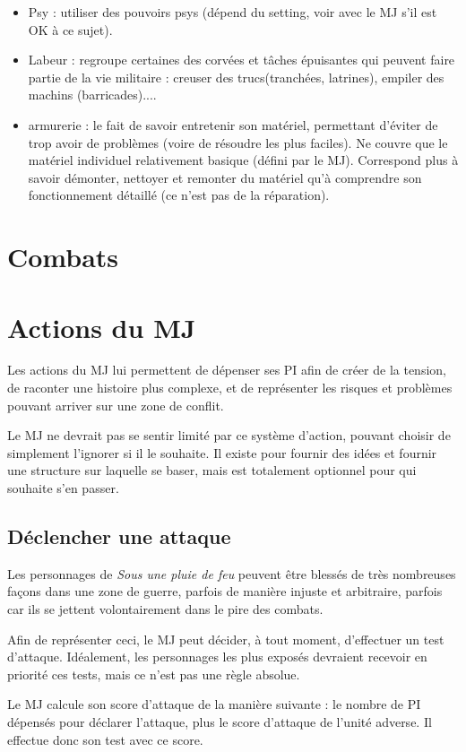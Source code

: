 \documentclass[twocolumn]{report}
\newcommand{\nomjeu}{\textit{Sous une pluie de feu }}
\begin{document}
\begin{itemize}
    \item Psy : utiliser des pouvoirs psys (dépend du setting, voir avec le MJ s'il est OK à ce sujet).
    \item Labeur : regroupe certaines des corvées et tâches épuisantes qui peuvent faire partie de la vie militaire : creuser des trucs(tranchées, latrines), empiler des machins (barricades)....
    \item armurerie : le fait de savoir entretenir son matériel, permettant d'éviter de trop avoir de problèmes (voire de résoudre les plus faciles). Ne couvre que le matériel individuel relativement basique (défini par le MJ). Correspond plus à savoir démonter, nettoyer et remonter du matériel qu'à comprendre son fonctionnement détaillé (ce n'est pas de la réparation).
\end{itemize}
\section{Combats}

\section{Actions du MJ}
Les actions du MJ lui permettent de dépenser ses PI afin de créer de la tension, de raconter une histoire plus complexe, et de représenter les risques et problèmes pouvant arriver sur une zone de conflit.

Le MJ ne devrait pas se sentir limité par ce système d'action, pouvant choisir de simplement l'ignorer si il le souhaite. Il existe pour fournir des idées et fournir une structure sur laquelle se baser, mais est totalement optionnel pour qui souhaite s'en passer.
\subsection{Déclencher une attaque}
Les personnages de \nomjeu peuvent être blessés de très nombreuses façons dans une zone de guerre, parfois de manière injuste et arbitraire, parfois car ils se jettent volontairement dans le pire des combats.

Afin de représenter ceci, le MJ peut décider, à tout moment, d'effectuer un test d'attaque. Idéalement, les personnages les plus exposés devraient recevoir en priorité ces tests, mais ce n'est pas une règle absolue.

Le MJ calcule son score d'attaque de la manière suivante : le nombre de PI dépensés pour déclarer l'attaque, plus le score d'attaque de l'unité adverse. Il effectue donc son test avec ce score.
\end{document}
